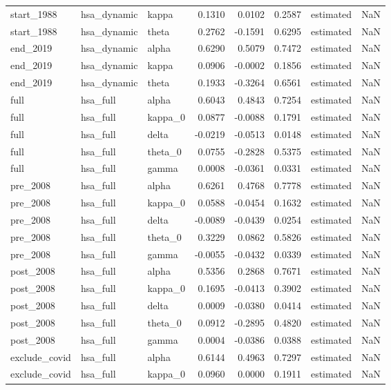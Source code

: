 \begin{tabular}{lllrrrlr}
start\_1988 & hsa\_dynamic & kappa & 0.1310 & 0.0102 & 0.2587 & estimated & NaN \\
start\_1988 & hsa\_dynamic & theta & 0.2762 & -0.1591 & 0.6295 & estimated & NaN \\
end\_2019 & hsa\_dynamic & alpha & 0.6290 & 0.5079 & 0.7472 & estimated & NaN \\
end\_2019 & hsa\_dynamic & kappa & 0.0906 & -0.0002 & 0.1856 & estimated & NaN \\
end\_2019 & hsa\_dynamic & theta & 0.1933 & -0.3264 & 0.6561 & estimated & NaN \\
full & hsa\_full & alpha & 0.6043 & 0.4843 & 0.7254 & estimated & NaN \\
full & hsa\_full & kappa\_0 & 0.0877 & -0.0088 & 0.1791 & estimated & NaN \\
full & hsa\_full & delta & -0.0219 & -0.0513 & 0.0148 & estimated & NaN \\
full & hsa\_full & theta\_0 & 0.0755 & -0.2828 & 0.5375 & estimated & NaN \\
full & hsa\_full & gamma & 0.0008 & -0.0361 & 0.0331 & estimated & NaN \\
pre\_2008 & hsa\_full & alpha & 0.6261 & 0.4768 & 0.7778 & estimated & NaN \\
pre\_2008 & hsa\_full & kappa\_0 & 0.0588 & -0.0454 & 0.1632 & estimated & NaN \\
pre\_2008 & hsa\_full & delta & -0.0089 & -0.0439 & 0.0254 & estimated & NaN \\
pre\_2008 & hsa\_full & theta\_0 & 0.3229 & 0.0862 & 0.5826 & estimated & NaN \\
pre\_2008 & hsa\_full & gamma & -0.0055 & -0.0432 & 0.0339 & estimated & NaN \\
post\_2008 & hsa\_full & alpha & 0.5356 & 0.2868 & 0.7671 & estimated & NaN \\
post\_2008 & hsa\_full & kappa\_0 & 0.1695 & -0.0413 & 0.3902 & estimated & NaN \\
post\_2008 & hsa\_full & delta & 0.0009 & -0.0380 & 0.0414 & estimated & NaN \\
post\_2008 & hsa\_full & theta\_0 & 0.0912 & -0.2895 & 0.4820 & estimated & NaN \\
post\_2008 & hsa\_full & gamma & 0.0004 & -0.0386 & 0.0388 & estimated & NaN \\
exclude\_covid & hsa\_full & alpha & 0.6144 & 0.4963 & 0.7297 & estimated & NaN \\
exclude\_covid & hsa\_full & kappa\_0 & 0.0960 & 0.0000 & 0.1911 & estimated & NaN \\

\end{tabular}
